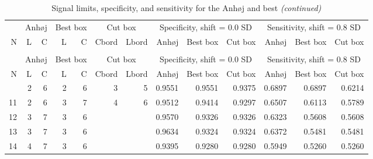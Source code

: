 \begin{Schunk}

\begin{longtable}{rrrrrrrrrrrrr}
\caption{\label{tab:tab1}Signal limits, specificity, and sensitivity for the Anhøj and best box
        rules and borders for the cut box rules. N = number of data points in
        chart.
        L = upper limit for longest run, C = lower limit for number of 
        crossings, for declaring random variation by the Anhøj and best 
        box rules. Cbord and Lbord = Additional information for the cut box
        rules. When specified, parts of the border of the best box to retain 
        to declare random variation. When not specified, cut box is identical
        to best box. }\\
\toprule
\multicolumn{1}{c}{ } & \multicolumn{2}{c}{Anhøj} & \multicolumn{2}{c}{Best box} & \multicolumn{2}{c}{Cut box} & \multicolumn{3}{c}{Specificity, shift = 0.0 SD} & \multicolumn{3}{c}{Sensitivity, shift = 0.8 SD} \\
\cmidrule(l{3pt}r{3pt}){2-3} \cmidrule(l{3pt}r{3pt}){4-5} \cmidrule(l{3pt}r{3pt}){6-7} \cmidrule(l{3pt}r{3pt}){8-10} \cmidrule(l{3pt}r{3pt}){11-13}
N & L & C & L & C & Cbord & Lbord & Anhøj & Best box & Cut box & Anhøj & Best box & Cut box\\
\midrule
\endfirsthead
\caption[]{Signal limits, specificity, and sensitivity for the Anhøj and best  \textit{(continued)}}\\
\toprule
\multicolumn{1}{c}{ } & \multicolumn{2}{c}{Anhøj} & \multicolumn{2}{c}{Best box} & \multicolumn{2}{c}{Cut box} & \multicolumn{3}{c}{Specificity, shift = 0.0 SD} & \multicolumn{3}{c}{Sensitivity, shift = 0.8 SD} \\
\cmidrule(l{3pt}r{3pt}){2-3} \cmidrule(l{3pt}r{3pt}){4-5} \cmidrule(l{3pt}r{3pt}){6-7} \cmidrule(l{3pt}r{3pt}){8-10} \cmidrule(l{3pt}r{3pt}){11-13}
N & L & C & L & C & Cbord & Lbord & Anhøj & Best box & Cut box & Anhøj & Best box & Cut box\\
\midrule
\endhead
\
\endfoot
\bottomrule
\endlastfoot
10 & 2 & 6 & 2 & 6 & 3 & 5 & 0.9551 & 0.9551 & 0.9375 & 0.6897 & 0.6897 & 0.6214\\
11 & 2 & 6 & 3 & 7 & 4 & 6 & 0.9512 & 0.9414 & 0.9297 & 0.6507 & 0.6113 & 0.5789\\
12 & 3 & 7 & 3 & 6 &  &  & 0.9570 & 0.9326 & 0.9326 & 0.6323 & 0.5608 & 0.5608\\
13 & 3 & 7 & 3 & 6 &  &  & 0.9634 & 0.9324 & 0.9324 & 0.6372 & 0.5481 & 0.5481\\
14 & 4 & 7 & 3 & 6 &  &  & 0.9395 & 0.9280 & 0.9280 & 0.5949 & 0.5260 & 0.5260\\

\end{longtable}
\end{Schunk}
